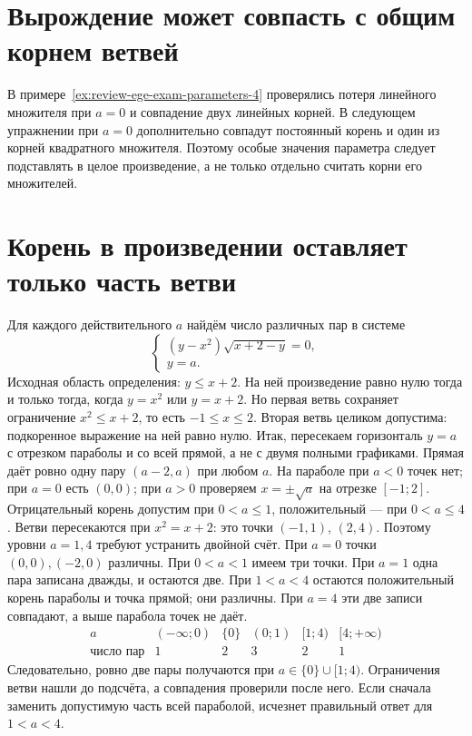 \section{Вырождение может совпасть с общим корнем ветвей}
В примере~\ref{ex:review-ege-exam-parameters-4} проверялись потеря линейного множителя при \(a=0\) и совпадение двух линейных корней. В следующем упражнении при \(a=0\) дополнительно совпадут постоянный корень и один из корней квадратного множителя. Поэтому особые значения параметра следует подставлять в целое произведение, а не только отдельно считать корни его множителей.
\section{Корень в произведении оставляет только часть ветви}
\begin{example}\label{ex:review-ege-final-parameters-A}
Для каждого действительного \(a\) найдём число различных пар в системе
\[
\begin{cases}
(y-x^2)\sqrt{x+2-y}=0,\\
y=a.
\end{cases}
\]
Исходная область определения: \(y\le x+2\). На ней произведение равно нулю тогда и только тогда, когда \(y=x^2\) или \(y=x+2\). Но первая ветвь сохраняет ограничение \(x^2\le x+2\), то есть \(-1\le x\le2\). Вторая ветвь целиком допустима: подкоренное выражение на ней равно нулю. Итак, пересекаем горизонталь \(y=a\) с отрезком параболы и со всей прямой, а не с двумя полными графиками.
Прямая даёт ровно одну пару \((a-2,a)\) при любом \(a\). На параболе при \(a<0\) точек нет; при \(a=0\) есть \((0,0)\); при \(a>0\) проверяем \(x=\pm\sqrt a\) на отрезке \([-1;2]\). Отрицательный корень допустим при \(0<a\le1\), положительный --- при \(0<a\le4\).
Ветви пересекаются при \(x^2=x+2\): это точки \((-1,1)\), \((2,4)\). Поэтому уровни \(a=1,4\) требуют устранить двойной счёт. При \(a=0\) точки \((0,0),(-2,0)\) различны. При \(0<a<1\) имеем три точки. При \(a=1\) одна пара записана дважды, и остаются две. При \(1<a<4\) остаются положительный корень параболы и точка прямой; они различны. При \(a=4\) эти две записи совпадают, а выше парабола точек не даёт.
\[
\begin{array}{c|ccccc}
a&(-\infty;0)&\{0\}&(0;1)&[1;4)&[4;+\infty)\\ \hline
\text{число пар}&1&2&3&2&1
\end{array}
\]
Следовательно, ровно две пары получаются при \(a\in\{0\}\cup[1;4)\). Ограничения ветви нашли до подсчёта, а совпадения проверили после него. Если сначала заменить допустимую часть всей параболой, исчезнет правильный ответ для \(1<a<4\).
\end{example}

